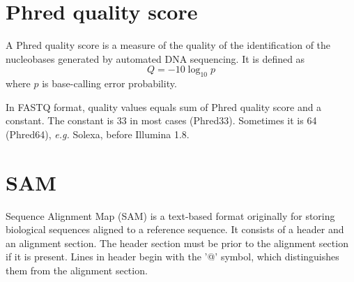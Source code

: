 \documentclass[11pt]{article}
\begin{document}
\begin{sloppypar}
\section{Phred quality score}
A Phred quality score is a measure of the quality of the identification of the nucleobases generated by automated DNA sequencing. 
It is defined as 
\begin{equation}
  Q = -10\log_{10}p
\end{equation}
where $p$ is base-calling error probability. 

\par

In FASTQ format, quality values equals sum of Phred quality score and a constant. 
The constant is 33 in most cases (Phred33). 
Sometimes it is 64 (Phred64), \textit{e.g.} Solexa, before Illumina 1.8.

\section{SAM}
Sequence Alignment Map (SAM) is a text-based format originally for storing biological sequences aligned to a reference sequence. 
It consists of a header and an alignment section. 
The header section must be prior to the alignment section if it is present. 
Lines in header begin with the '@' symbol, which distinguishes them from the alignment section. 

\par


\end{sloppypar}
\end{document}
